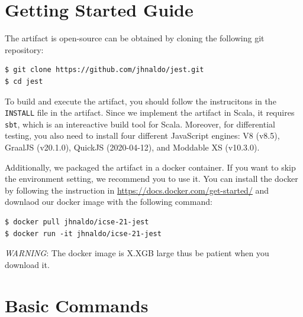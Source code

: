 \documentclass{article}
\begin{document}
\section{Getting Started Guide}

The artifact is open-source can be obtained by cloning the following git
repository:
\begin{lstlisting}
$ git clone https://github.com/jhnaldo/jest.git
$ cd jest
\end{lstlisting}
To build and execute the artifact, you should follow the instrucitons in the
\texttt{INSTALL} file in the artifact.  Since we implement the artifact in
Scala, it requires \texttt{sbt}, which is an intereactive build tool for Scala.
Moreover, for differential testing, you also need to install four different
JavaScript engines: V8 (v8.5), GraalJS (v20.1.0), QuickJS (2020-04-12), and
Moddable XS (v10.3.0).

Additionally, we packaged the artifact in a docker container.  If you want to
skip the environment setting, we recommend you to use it.  You can install the
docker by following the instruction in
\url{https://docs.docker.com/get-started/} and downlaod our docker image with
the following command:
\begin{lstlisting}
$ docker pull jhnaldo/icse-21-jest
$ docker run -it jhnaldo/icse-21-jest
\end{lstlisting}
\textit{WARNING}: The docker image is X.XGB large thus be patient when you
download it.


\section{Basic Commands}
\end{document}
